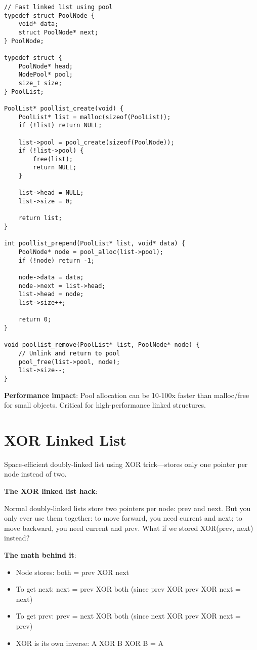 \begin{lstlisting}
// Fast linked list using pool
typedef struct PoolNode {
    void* data;
    struct PoolNode* next;
} PoolNode;

typedef struct {
    PoolNode* head;
    NodePool* pool;
    size_t size;
} PoolList;

PoolList* poollist_create(void) {
    PoolList* list = malloc(sizeof(PoolList));
    if (!list) return NULL;

    list->pool = pool_create(sizeof(PoolNode));
    if (!list->pool) {
        free(list);
        return NULL;
    }

    list->head = NULL;
    list->size = 0;

    return list;
}

int poollist_prepend(PoolList* list, void* data) {
    PoolNode* node = pool_alloc(list->pool);
    if (!node) return -1;

    node->data = data;
    node->next = list->head;
    list->head = node;
    list->size++;

    return 0;
}

void poollist_remove(PoolList* list, PoolNode* node) {
    // Unlink and return to pool
    pool_free(list->pool, node);
    list->size--;
}
\end{lstlisting}

\textbf{Performance impact}: Pool allocation can be 10-100x faster than malloc/free for small objects. Critical for high-performance linked structures.

\section{XOR Linked List}

Space-efficient doubly-linked list using XOR trick---stores only one pointer per node instead of two.

\textbf{The XOR linked list hack}:

Normal doubly-linked lists store two pointers per node: prev and next. But you only ever use them together: to move forward, you need current and next; to move backward, you need current and prev. What if we stored XOR(prev, next) instead?

\textbf{The math behind it}:
\begin{itemize}
    \item Node stores: both = prev XOR next
    \item To get next: next = prev XOR both (since prev XOR prev XOR next = next)
    \item To get prev: prev = next XOR both (since next XOR prev XOR next = prev)
    \item XOR is its own inverse: A XOR B XOR B = A
\end{itemize}

